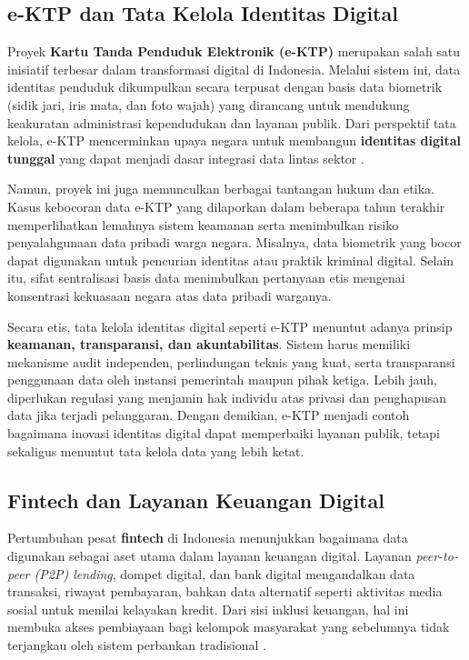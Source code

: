 \subsection{e-KTP dan Tata Kelola Identitas Digital}

Proyek \textbf{Kartu Tanda Penduduk Elektronik (e-KTP)} merupakan salah satu inisiatif terbesar dalam transformasi digital di Indonesia. Melalui sistem ini, data identitas penduduk dikumpulkan secara terpusat dengan basis data biometrik (sidik jari, iris mata, dan foto wajah) yang dirancang untuk mendukung keakuratan administrasi kependudukan dan layanan publik. Dari perspektif tata kelola, e-KTP mencerminkan upaya negara untuk membangun \textbf{identitas digital tunggal} yang dapat menjadi dasar integrasi data lintas sektor \cite{setiawan2019ektp}.  

Namun, proyek ini juga memunculkan berbagai tantangan hukum dan etika. Kasus kebocoran data e-KTP yang dilaporkan dalam beberapa tahun terakhir memperlihatkan lemahnya sistem keamanan serta menimbulkan risiko penyalahgunaan data pribadi warga negara. Misalnya, data biometrik yang bocor dapat digunakan untuk pencurian identitas atau praktik kriminal digital. Selain itu, sifat sentralisasi basis data menimbulkan pertanyaan etis mengenai konsentrasi kekuasaan negara atas data pribadi warganya.  

Secara etis, tata kelola identitas digital seperti e-KTP menuntut adanya prinsip \textbf{keamanan, transparansi, dan akuntabilitas}. Sistem harus memiliki mekanisme audit independen, perlindungan teknis yang kuat, serta transparansi penggunaan data oleh instansi pemerintah maupun pihak ketiga. Lebih jauh, diperlukan regulasi yang menjamin hak individu atas privasi dan penghapusan data jika terjadi pelanggaran. Dengan demikian, e-KTP menjadi contoh bagaimana inovasi identitas digital dapat memperbaiki layanan publik, tetapi sekaligus menuntut tata kelola data yang lebih ketat.

\subsection{Fintech dan Layanan Keuangan Digital}

Pertumbuhan pesat \textbf{fintech} di Indonesia menunjukkan bagaimana data digunakan sebagai aset utama dalam layanan keuangan digital. Layanan \textit{peer-to-peer (P2P) lending}, dompet digital, dan bank digital mengandalkan data transaksi, riwayat pembayaran, bahkan data alternatif seperti aktivitas media sosial untuk menilai kelayakan kredit. Dari sisi inklusi keuangan, hal ini membuka akses pembiayaan bagi kelompok masyarakat yang sebelumnya tidak terjangkau oleh sistem perbankan tradisional \cite{ojk2017}.  


